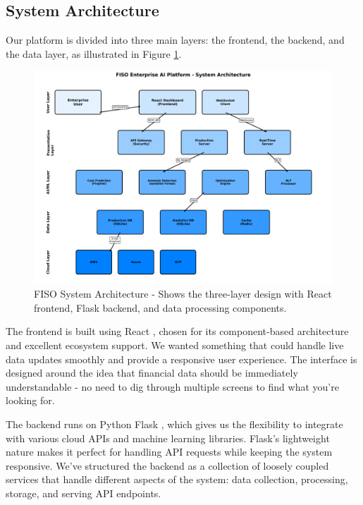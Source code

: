 \documentclass[conference]{IEEEtran}
\begin{document}
\subsection{System Architecture}

Our platform is divided into three main layers: the frontend, the backend, and the data layer, as illustrated in Figure \ref{fig:architecture}.

\begin{figure}[h]
    \centering
    \begin{mdframed}[style=imagestyle]
        \includegraphics[width=\columnwidth]{docs/images/system_architecture.png}
    \end{mdframed}
    \caption{FISO System Architecture - Shows the three-layer design with React frontend, Flask backend, and data processing components.}
    \label{fig:architecture}
\end{figure}

The frontend is built using React \cite{react}, chosen for its component-based architecture and excellent ecosystem support. We wanted something that could handle live data updates smoothly and provide a responsive user experience. The interface is designed around the idea that financial data should be immediately understandable - no need to dig through multiple screens to find what you're looking for.

The backend runs on Python Flask \cite{flask}, which gives us the flexibility to integrate with various cloud APIs and machine learning libraries. Flask's lightweight nature makes it perfect for handling API requests while keeping the system responsive. We've structured the backend as a collection of loosely coupled services that handle different aspects of the system: data collection, processing, storage, and serving API endpoints.
\end{document}
